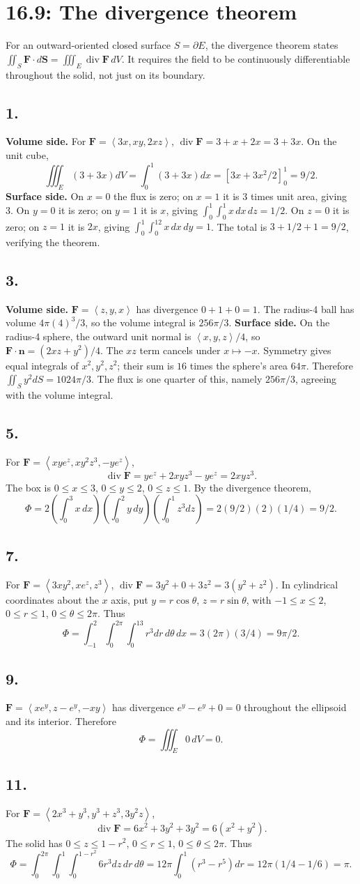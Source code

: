 \documentclass[11pt]{article}
\newcommand{\ex}[1]{\subsection*{#1.}}
\newcommand{\ans}[1]{\boxed{#1}}
\newcommand{\vv}[1]{\left\langle #1\right\rangle}
\begin{document}
\clearpage\section*{16.9: The divergence theorem}
For an outward-oriented closed surface $S=\partial E$, the divergence theorem states $\iint_S\mathbf F\cdot d\mathbf S=\iiint_E\operatorname{div}\mathbf F\,dV$. It requires the field to be continuously differentiable throughout the solid, not just on its boundary.
\ex{1}
\textbf{Volume side.} For $\mathbf F=\vv{3x,xy,2xz}$, $\operatorname{div}\mathbf F=3+x+2x=3+3x$. On the unit cube,
\[\iiint_E(3+3x)dV=\int_0^1(3+3x)dx=[3x+3x^2/2]_0^1=\ans{9/2}.\]
\textbf{Surface side.} On $x=0$ the flux is zero; on $x=1$ it is $3$ times unit area, giving 3. On $y=0$ it is zero; on $y=1$ it is $x$, giving $\int_0^1\int_0^1x\,dx\,dz=1/2$. On $z=0$ it is zero; on $z=1$ it is $2x$, giving $\int_0^1\int_0^12x\,dx\,dy=1$. The total is $3+1/2+1=\ans{9/2}$, verifying the theorem.
\ex{3}
\textbf{Volume side.} $\mathbf F=\vv{z,y,x}$ has divergence $0+1+0=1$. The radius-4 ball has volume $4\pi(4)^3/3$, so the volume integral is $\ans{256\pi/3}$.
\textbf{Surface side.} On the radius-4 sphere, the outward unit normal is $\vv{x,y,z}/4$, so $\mathbf F\cdot\mathbf n=(2xz+y^2)/4$. The $xz$ term cancels under $x\mapsto-x$. Symmetry gives equal integrals of $x^2,y^2,z^2$; their sum is $16$ times the sphere's area $64\pi$. Therefore $\iint_Sy^2dS=1024\pi/3$. The flux is one quarter of this, namely $\ans{256\pi/3}$, agreeing with the volume integral.
\ex{5}
For $\mathbf F=\vv{xye^z,xy^2z^3,-ye^z}$,
\[\operatorname{div}\mathbf F=ye^z+2xyz^3-ye^z=2xyz^3.\]
The box is $0\le x\le3$, $0\le y\le2$, $0\le z\le1$. By the divergence theorem,
\[\Phi=2\left(\int_0^3x\,dx\right)\left(\int_0^2y\,dy\right)\left(\int_0^1z^3dz\right)
=2(9/2)(2)(1/4)=\ans{9/2}.\]
\ex{7}
For $\mathbf F=\vv{3xy^2,xe^z,z^3}$, $\operatorname{div}\mathbf F=3y^2+0+3z^2=3(y^2+z^2)$. In cylindrical coordinates about the $x$ axis, put $y=r\cos\theta$, $z=r\sin\theta$, with $-1\le x\le2$, $0\le r\le1$, $0\le\theta\le2\pi$. Thus
\[\Phi=\int_{-1}^2\int_0^{2\pi}\int_0^13r^3dr\,d\theta\,dx
=3(2\pi)(3/4)=\ans{9\pi/2}.\]
\ex{9}
$\mathbf F=\vv{xe^y,z-e^y,-xy}$ has divergence $e^y-e^y+0=0$ throughout the ellipsoid and its interior. Therefore
\[\Phi=\iiint_E0\,dV=\ans{0}.\]
\ex{11}
For $\mathbf F=\vv{2x^3+y^3,y^3+z^3,3y^2z}$,
\[\operatorname{div}\mathbf F=6x^2+3y^2+3y^2=6(x^2+y^2).\]
The solid has $0\le z\le1-r^2$, $0\le r\le1$, $0\le\theta\le2\pi$. Thus
\[\Phi=\int_0^{2\pi}\int_0^1\int_0^{1-r^2}6r^3dz\,dr\,d\theta
=12\pi\int_0^1(r^3-r^5)dr=12\pi(1/4-1/6)=\ans{\pi}.\]
\end{document}
